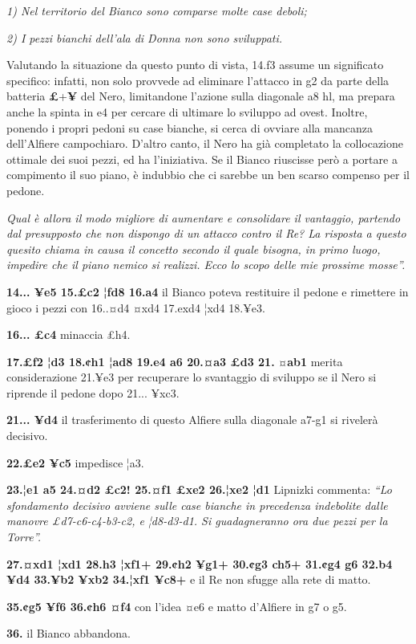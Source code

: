 \emph{1) Nel territorio del Bianco sono comparse molte case deboli;}

\emph{2) I pezzi bianchi dell'ala di Donna non sono sviluppati.}

Valutando la situazione da questo punto di vista, 14.f3 assume un
significato specifico: infatti, non solo provvede ad eliminare l'attacco
in g2 da parte della batteria \textbf{£}+\textbf{¥} del Nero,
limitandone l'azione sulla diagonale a8 hl, ma prepara anche la spinta
in e4 per cercare di ultimare lo sviluppo ad ovest. Inoltre, ponendo i
propri pedoni su case bianche, si cerca di ovviare alla mancanza
dell'Alfiere campochiaro. D'altro canto, il Nero ha già completato la
collocazione ottimale dei suoi pezzi, ed ha l'iniziativa. Se il Bianco
riuscisse però a portare a compimento il suo piano, è indubbio che ci
sarebbe un ben scarso compenso per il pedone.

\emph{Qual è allora il modo migliore di aumentare e consolidare il
vantaggio, partendo dal presupposto che non dispongo di un attacco
contro il Re? La risposta a questo quesito chiama in causa il concetto
secondo il quale bisogna, in primo luogo, impedire che il piano nemico
si realizzi. Ecco lo scopo delle mie prossime mosse''.}

\textbf{14... ¥e5 15.£c2 ¦fd8 16.a4} il Bianco poteva restituire il
pedone e rimettere in gioco i pezzi con 16..¤d4 ¤xd4 17.exd4 ¦xd4
18.¥e3.

\textbf{16... £c4} minaccia £h4.

\textbf{17.£f2 ¦d3 18.¢h1 ¦ad8 19.e4 a6 20.¤a3 £d3 21.} ¤\textbf{ab1}
merita considerazione 21.¥e3 per recuperare lo svantaggio di sviluppo se
il Nero si riprende il pedone dopo 21... ¥xc3.

\textbf{21... ¥d4} il trasferimento di questo Alfiere sulla diagonale
a7-g1 si rivelerà decisivo.

\textbf{22.£e2 ¥c5} impedisce ¦a3.

\textbf{23.¦e1 a5 24.¤d2 £c2! 25.¤f1 £xe2 26.¦xe2 ¦d1} Lipnizki
commenta: \emph{``Lo sfondamento decisivo avviene sulle case bianche in
precedenza indebolite dalle manovre £d7-c6-c4-b3-c2, e ¦d8-d3-d1. Si
guadagneranno ora due pezzi per la Torre''.}

\textbf{27.¤xd1 ¦xd1 28.h3 ¦xf1+ 29.¢h2 ¥g1+ 30.¢g3 ch5+ 31.¢g4 g6 32.b4
¥d4 33.¥b2 ¥xb2 34.¦xf1 ¥c8+} e il Re non sfugge alla rete di matto.

\textbf{35.¢g5 ¥f6 36.¢h6 ¤f4} con l'idea ¤e6 e matto d'Alfiere in g7 o
g5.

\textbf{36.} il Bianco abbandona.

